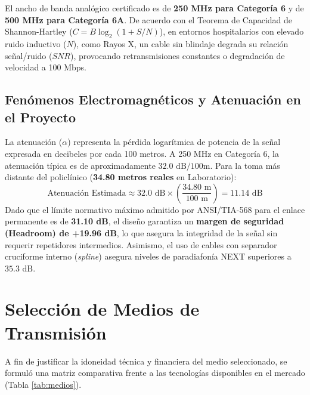 \documentclass[11pt,a4paper]{article}
\begin{document}
El ancho de banda analógico certificado es de \textbf{250 MHz para Categoría 6} y de \textbf{500 MHz para Categoría 6A}. De acuerdo con el Teorema de Capacidad de Shannon-Hartley ($C = B \log_2 (1 + S/N)$), en entornos hospitalarios con elevado ruido inductivo ($N$), como Rayos X, un cable sin blindaje degrada su relación señal/ruido ($SNR$), provocando retransmisiones constantes o degradación de velocidad a 100 Mbps.

\subsection{Fenómenos Electromagnéticos y Atenuación en el Proyecto}
La atenuación ($\alpha$) representa la pérdida logarítmica de potencia de la señal expresada en decibeles por cada 100 metros. A 250 MHz en Categoría 6, la atenuación típica es de aproximadamente $32.0\text{ dB/100m}$. Para la toma más distante del policlínico (\textbf{34.80 metros reales} en Laboratorio):
\begin{equation}
    \text{Atenuación Estimada} \approx 32.0\text{ dB} \times \left(\frac{34.80\text{ m}}{100\text{ m}}\right) = 11.14\text{ dB}
\end{equation}
Dado que el límite normativo máximo admitido por ANSI/TIA-568 para el enlace permanente es de \textbf{31.10 dB}, el diseño garantiza un \textbf{margen de seguridad (Headroom) de +19.96 dB}, lo que asegura la integridad de la señal sin requerir repetidores intermedios. Asimismo, el uso de cables con separador cruciforme interno (\textit{spline}) asegura niveles de paradiafonía NEXT superiores a $35.3\text{ dB}$.

\section{Selección de Medios de Transmisión}

A fin de justificar la idoneidad técnica y financiera del medio seleccionado, se formuló una matriz comparativa frente a las tecnologías disponibles en el mercado (Tabla \ref{tab:medios}).
\end{document}
